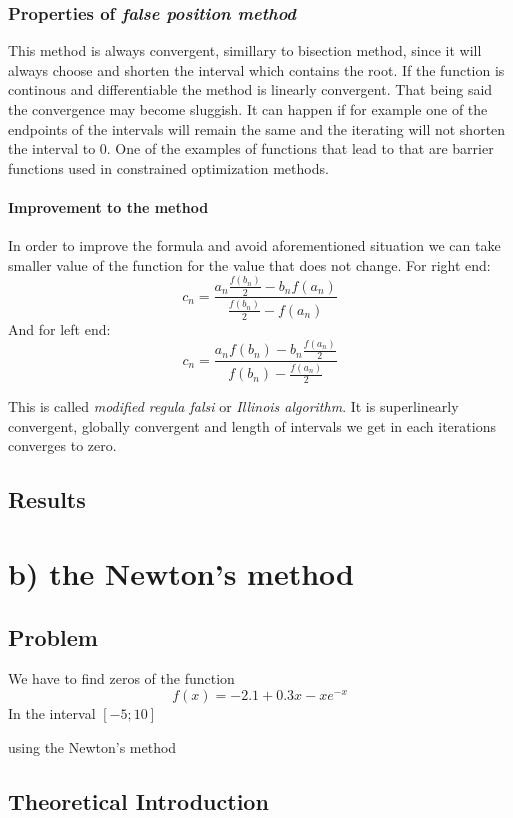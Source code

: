 \documentclass[12pt]{report}
\begin{document}
\subsubsection{Properties of \emph{false position method}}
This method is always convergent, simillary to bisection method, since it will always choose and shorten the interval which contains the root. If the function is continous and differentiable the method is linearly convergent. That being said the convergence may become sluggish. It can happen if for example one of the endpoints of the intervals will remain the same and the iterating will not shorten the interval to 0. One of the examples of functions that lead to that are barrier functions used in constrained optimization methods.

\paragraph{Improvement to the method}
In order to improve the formula and avoid aforementioned situation we can take smaller value of the function for the value that does not change.
For right end:
\[ c_n = \frac{a_n\frac{f(b_n)}{2} - b_nf(a_n)}{\frac{f(b_n)}{2} - f(a_n)} \]
And for left end:
\[ c_n = \frac{a_nf(b_n) - b_n\frac{f(a_n)}{2}}{f(b_n)- \frac{f(a_n)}{2}} \]

This is called \emph{modified regula falsi} or \emph{Illinois algorithm}.
It is superlinearly convergent, globally convergent and length of intervals we get in each iterations converges to zero. 
\subsection{Results}

\section{b) the Newton's method}

\subsection{Problem}

We have to find zeros of the function
\[ f(x) = -2.1 + 0.3x - xe^{-x} \]
In the interval $[-5; 10]$

using the Newton's method
\subsection{Theoretical Introduction}
\end{document}
